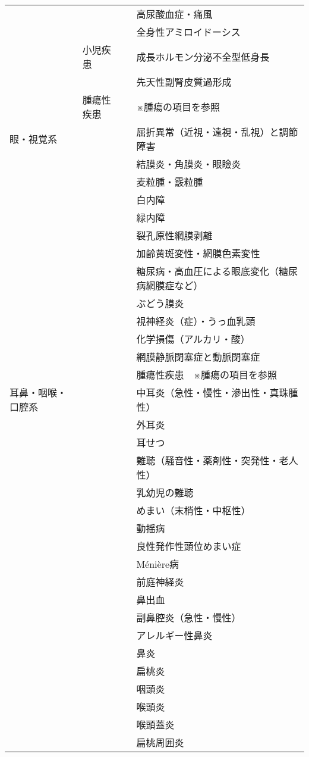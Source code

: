 \begin{xltabular}{\linewidth}{XXXX}
 &  &  & 高尿酸血症・痛風 \\
 &  &  & 全身性アミロイドーシス \\
 & 小児疾患 &  & 成長ホルモン分泌不全型低身長 \\
 &  &  & 先天性副腎皮質過形成 \\
 & 腫瘍性疾患 &  & ※腫瘍の項目を参照 \\
眼・視覚系 &  &  & 屈折異常（近視・遠視・乱視）と調節障害 \\
 &  &  & 結膜炎・角膜炎・眼瞼炎 \\
 &  &  & 麦粒腫・霰粒腫 \\
 &  &  & 白内障 \\
 &  &  & 緑内障 \\
 &  &  & 裂孔原性網膜剥離 \\
 &  &  & 加齢黄斑変性・網膜色素変性 \\
 &  &  & 糖尿病・高血圧による眼底変化（糖尿病網膜症など） \\
 &  &  & ぶどう膜炎 \\
 &  &  & 視神経炎（症）・うっ血乳頭 \\
 &  &  & 化学損傷（アルカリ・酸） \\
 &  &  & 網膜静脈閉塞症と動脈閉塞症 \\
 &  &  & 腫瘍性疾患　※腫瘍の項目を参照 \\
耳鼻・咽喉・口腔系 &  &  & 中耳炎（急性・慢性・滲出性・真珠腫性） \\
 &  &  & 外耳炎 \\
 &  &  & 耳せつ \\
 &  &  & 難聴（騒音性・薬剤性・突発性・老人性） \\
 &  &  & 乳幼児の難聴 \\
 &  &  & めまい（末梢性・中枢性） \\
 &  &  & 動揺病 \\
 &  &  & 良性発作性頭位めまい症 \\
 &  &  & Ménière病 \\
 &  &  & 前庭神経炎 \\
 &  &  & 鼻出血 \\
 &  &  & 副鼻腔炎（急性・慢性） \\
 &  &  & アレルギー性鼻炎 \\
 &  &  & 鼻炎 \\
 &  &  & 扁桃炎 \\
 &  &  & 咽頭炎 \\
 &  &  & 喉頭炎 \\
 &  &  & 喉頭蓋炎 \\
 &  &  & 扁桃周囲炎 \\

\end{xltabular}
